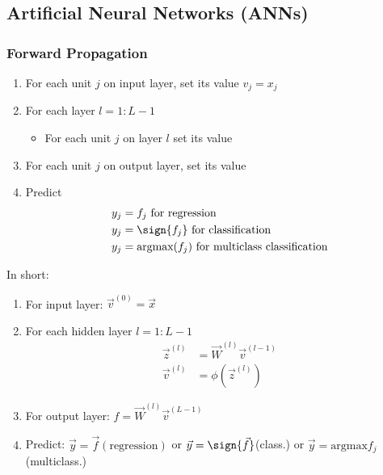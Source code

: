 \documentclass[8pt,a4paper]{scrartcl}
\begin{document}
\begin{multicols*}{3}
\subsection{Artificial Neural Networks (ANNs)}



\subsubsection{Forward Propagation}

\begin{enumerate}
\ncompaq
\item For each unit $j$ on input layer, set its value $v_j=x_j$
\item For each layer $l=1:L-1$
\begin{itemize}
\ncompaq
\item For each unit $j$ on layer $l$ set its value
\end{itemize}
\item For each unit $j$ on output layer, set its value
\item Predict
\begin{align*}
y_j&=f_j\text{ for regression}\\
y_j&=\sign{f_j}\text{ for classification}\\
y_j&=\text{argmax}(f_j)\text{ for multiclass classification}
\end{align*}
\end{enumerate}

In short:

\begin{enumerate}
\ncompaq
\item For input layer: $\vec{v}^{(0)}=\vec{x}$
\item For each hidden layer $l=1:L-1$
\begin{align*}
\vec{z}^{(l)}&=\vec{W}^{(l)}\vec{v}^{(l-1)}\\
\vec{v}^{(l)}&=\phi\left(\vec{z}^{(l)}\right)
\end{align*}
\item For output layer: $f=\vec{W}^{(l)}\vec{v}^{(L-1)}$
\item Predict: $\vec{y}=\vec{f}(\text{regression})$ or $\vec{y} = \sign{\vec{f}}$(class.) or $\vec{y}=\text{argmax} f_j$ (multiclass.)
\end{enumerate}


\end{multicols*}
\end{document}
